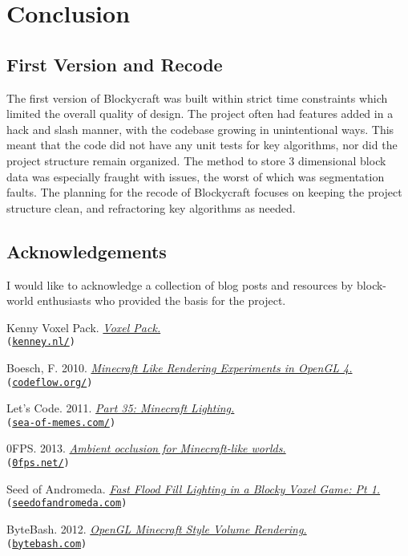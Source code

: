 \documentclass[a4paper,11pt,titlepage]{scrartcl}
\newcommand{\Blockycraft}{Blockycraft}
\begin{document}

\section{Conclusion}
\subsection{First Version and Recode}
The first version of \Blockycraft{} was built within strict time constraints which limited the overall quality of design. The project often had features added in a hack and slash manner, with the codebase growing in unintentional ways.  This meant that the code did not have any unit tests for key algorithms, nor did the project structure remain organized.  The method to store 3 dimensional block data was especially fraught with issues, the worst of which was segmentation faults.  The planning for the recode of \Blockycraft{} focuses on keeping the project structure clean, and refractoring key algorithms as needed. 

\subsection{Acknowledgements}
I would like to acknowledge a collection of blog posts and resources by block-world enthusiasts who provided the basis for the project.

\begin{enumerate}[label*={[\arabic{enumi}]}]
\item Kenny Voxel Pack. {\em \href{http://kenney.nl/assets/voxel-pack}{Voxel Pack.}} \\\texttt{(\url{kenney.nl/})}
\item Boesch, F. 2010. {\em \href{http://codeflow.org/entries/2010/dec/09/minecraft-like-rendering-experiments-in-opengl-4/#ambient-occlusion}{Minecraft Like Rendering Experiments in OpenGL 4.}}\\\texttt{(\url{codeflow.org/})}
\item Let's Code. 2011. {\em \href{http://www.sea-of-memes.com/LetsCode35/LetsCode35.html}{Part 35: Minecraft Lighting.}}\\\texttt{(\url{sea-of-memes.com/})}
\item 0FPS. 2013. {\em \href{https://0fps.net/2013/07/03/ambient-occlusion-for-minecraft-like-worlds/}{Ambient occlusion for Minecraft-like worlds.}}\\\texttt{(\url{0fps.net/})}
\item Seed of Andromeda. {\em \href{https://www.seedofandromeda.com/blogs/29-fast-flood-fill-lighting-in-a-blocky-voxel-game-pt-1/}{Fast Flood Fill Lighting in a Blocky Voxel Game: Pt 1.}}\\\texttt{(\url{seedofandromeda.com})}
\item ByteBash. 2012. {\em \href{http://bytebash.com/2012/03/opengl-volume-rendering/}{OpenGL Minecraft Style Volume Rendering.}} \\\texttt{(\url{bytebash.com})}
\end{enumerate}
\end{document}
